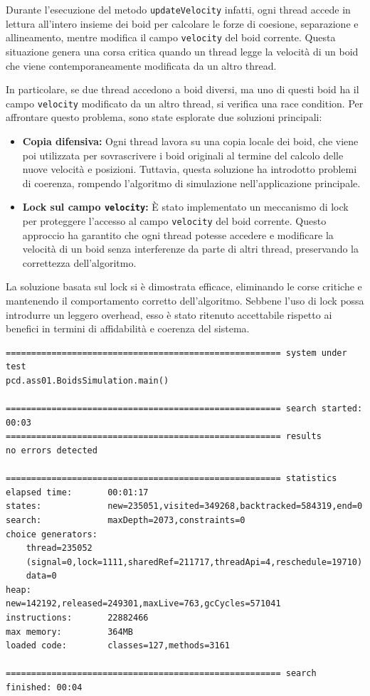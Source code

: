 \documentclass[a4paper,12pt]{report}
\begin{document}
Durante l'esecuzione del metodo \texttt{updateVelocity} infatti, ogni thread accede in lettura all'intero insieme dei boid per calcolare le forze di coesione, separazione e allineamento, mentre modifica il campo \texttt{velocity} del boid corrente. Questa situazione genera una corsa critica quando un thread legge la velocità di un boid che viene contemporaneamente modificata da un altro thread.

In particolare, se due thread accedono a boid diversi, ma uno di questi boid ha il campo \texttt{velocity} modificato da un altro thread, si verifica una race condition. Per affrontare questo problema, sono state esplorate due soluzioni principali:

\begin{itemize}
    \item \textbf{Copia difensiva:} Ogni thread lavora su una copia locale dei boid, che viene poi utilizzata per sovrascrivere i boid originali al termine del calcolo delle nuove velocità e posizioni. Tuttavia, questa soluzione ha introdotto problemi di coerenza, rompendo l'algoritmo di simulazione nell'applicazione principale.
    \item \textbf{Lock sul campo \texttt{velocity}:} È stato implementato un meccanismo di lock per proteggere l'accesso al campo \texttt{velocity} del boid corrente. Questo approccio ha garantito che ogni thread potesse accedere e modificare la velocità di un boid senza interferenze da parte di altri thread, preservando la correttezza dell'algoritmo.
\end{itemize}

La soluzione basata sul lock si è dimostrata efficace, eliminando le corse critiche e mantenendo il comportamento corretto dell'algoritmo. Sebbene l'uso di lock possa introdurre un leggero overhead, esso è stato ritenuto accettabile rispetto ai benefici in termini di affidabilità e coerenza del sistema.

\begin{verbatim}
====================================================== system under test
pcd.ass01.BoidsSimulation.main()

====================================================== search started: 00:03
====================================================== results
no errors detected

====================================================== statistics
elapsed time:       00:01:17
states:             new=235051,visited=349268,backtracked=584319,end=0
search:             maxDepth=2073,constraints=0
choice generators:  
    thread=235052 
    (signal=0,lock=1111,sharedRef=211717,threadApi=4,reschedule=19710)
    data=0
heap:               new=142192,released=249301,maxLive=763,gcCycles=571041
instructions:       22882466
max memory:         364MB
loaded code:        classes=127,methods=3161

====================================================== search finished: 00:04
\end{verbatim}
\end{document}
